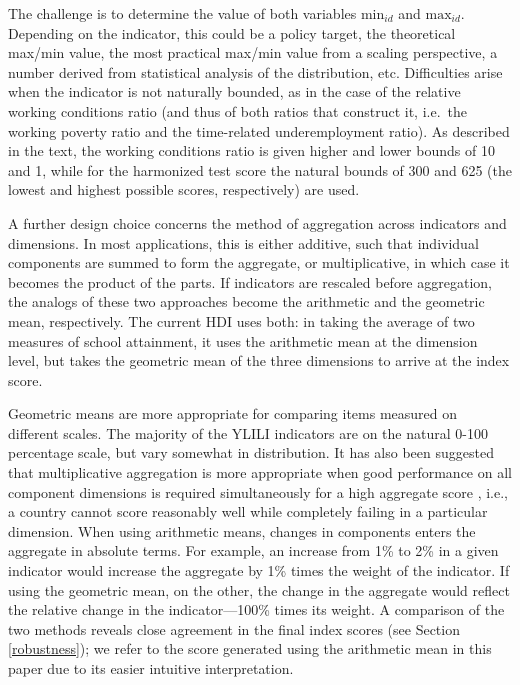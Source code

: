 \documentclass[
  a4paper, twoside, 12pt]{book}
\begin{document}
The challenge is to determine the value of both variables \(\text{min}_{id}\) and \(\text{max}_{id}\). Depending on the indicator, this could be a policy target, the theoretical max/min value, the most practical max/min value from a scaling perspective, a number derived from statistical analysis of the distribution, etc. Difficulties arise when the indicator is not naturally bounded, as in the case of the relative working conditions ratio (and thus of both ratios that construct it, i.e.~the working poverty ratio and the time-related underemployment ratio). As described in the text, the working conditions ratio is given higher and lower bounds of 10 and 1, while for the harmonized test score the natural bounds of 300 and 625 (the lowest and highest possible scores, respectively) are used.

A further design choice concerns the method of aggregation across indicators and dimensions. In most applications, this is either additive, such that individual components are summed to form the aggregate, or multiplicative, in which case it becomes the product of the parts. If indicators are rescaled before aggregation, the analogs of these two approaches become the arithmetic and the geometric mean, respectively. The current HDI uses both: in taking the average of two measures of school attainment, it uses the arithmetic mean at the dimension level, but takes the geometric mean of the three dimensions to arrive at the index score.

Geometric means are more appropriate for comparing items measured on different scales. The majority of the YLILI indicators are on the natural 0-100 percentage scale, but vary somewhat in distribution. It has also been suggested that multiplicative aggregation is more appropriate when good performance on all component dimensions is required simultaneously for a high aggregate score \autocite{sagar1998}, i.e., a country cannot score reasonably well while completely failing in a particular dimension. When using arithmetic means, changes in components enters the aggregate in absolute terms. For example, an increase from 1\% to 2\% in a given indicator would increase the aggregate by 1\% times the weight of the indicator. If using the geometric mean, on the other, the change in the aggregate would reflect the relative change in the indicator---100\% times its weight. A comparison of the two methods reveals close agreement in the final index scores (see Section \ref{robustness}); we refer to the score generated using the arithmetic mean in this paper due to its easier intuitive interpretation.
\end{document}

